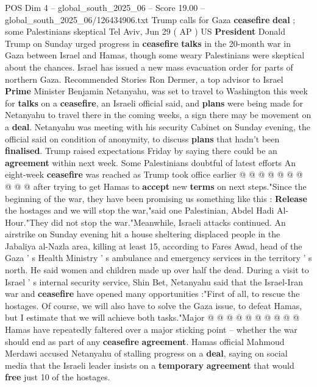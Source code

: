 \begin{textsample}{POS Dim 4 – global\_south\_2025\_06 – Score 19.00 – global\_south\_2025\_06/126434906.txt}  \label{ex:f4_pos_354}
Trump calls for Gaza \textbf{ceasefire} \textbf{deal} ; some Palestinians skeptical Tel Aviv, Jun 29 ( AP ) US \textbf{President} Donald Trump on Sunday urged progress in \textbf{ceasefire} \textbf{talks} in the 20-month war in Gaza between Israel and Hamas, though some weary Palestinians were skeptical about the chances.
Israel has issued a new mass evacuation order for parts of northern Gaza.
Recommended Stories Ron Dermer, a top advisor to Israel \textbf{Prime} Minister Benjamin Netanyahu, was set to travel to Washington this week for \textbf{talks} on a \textbf{ceasefire}, an Israeli official said, and \textbf{plans} were being made for Netanyahu to travel there in the coming weeks, a sign there may be movement on a \textbf{deal}.
Netanyahu was meeting with his security Cabinet on Sunday evening, the official said on condition of anonymity, to discuss \textbf{plans} that hadn't been \textbf{finalised}.
Trump raised expectations Friday by saying there could be an \textbf{agreement} within next week.
Some Palestinians doubtful of latest efforts An eight-week \textbf{ceasefire} was reached as Trump took office earlier @ @ @ @ @ @ @ @ @ @ after trying to get Hamas to \textbf{accept} new \textbf{terms} on next steps."Since the beginning of the war, they have been promising us something like this : \textbf{Release} the hostages and we will stop the war,"said one Palestinian, Abdel Hadi Al-Hour."They did not stop the war."Meanwhile, Israeli attacks continued.
An airstrike on Sunday evening hit a house sheltering displaced people in the Jabaliya al-Nazla area, killing at least 15, according to Fares Awad, head of the Gaza ' s Health Ministry ' s ambulance and emergency services in the territory ' s north.
He said women and children made up over half the dead.
During a visit to Israel ' s internal security service, Shin Bet, Netanyahu said that the Israel-Iran war and \textbf{ceasefire} have opened many opportunities :"First of all, to rescue the hostages.
Of course, we will also have to solve the Gaza issue, to defeat Hamas, but I estimate that we will achieve both tasks."Major @ @ @ @ @ @ @ @ @ @ Hamas have repeatedly faltered over a major sticking point -- whether the war should end as part of any \textbf{ceasefire} \textbf{agreement}.
Hamas official Mahmoud Merdawi accused Netanyahu of stalling progress on a \textbf{deal}, saying on social media that the Israeli leader insists on a \textbf{temporary} \textbf{agreement} that would \textbf{free} just 10 of the hostages.

\end{textsample}
